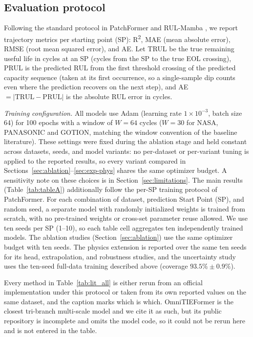 \documentclass[final,5p,times,twocolumn]{elsarticle}
\begin{document}
\subsection{Evaluation protocol}
\label{sec:protocol}

Following the standard protocol in PatchFormer \cite{ref_patchformer}
and RUL-Mamba \cite{ref_rulmamba}, we report trajectory
metrics per starting point (SP): R\textsuperscript{2}, MAE (mean absolute error),
RMSE (root mean squared error), and AE. Let TRUL be the true
remaining useful life in cycles at an SP (cycles from the SP to the
true EOL crossing), PRUL is the predicted RUL from the first threshold
crossing of the predicted capacity sequence (taken at its first occurrence, so
a single-sample dip counts even where the prediction recovers on the next
step), and AE $= |\text{TRUL} - \text{PRUL}|$ is the absolute RUL error in
cycles.

\emph{Training configuration.} All models use Adam (learning rate
$1\times10^{-3}$, batch size 64) for 100 epochs with a window of
$W{=}64$ cycles ($W{=}30$ for NASA, PANASONIC and GOTION, matching the
window convention of the baseline literature). These settings were
fixed during the ablation stage and held constant across datasets,
seeds, and model variants: no per-dataset or per-variant tuning is
applied to the reported results, so every variant compared in
Sections~\ref{sec:ablation}--\ref{sec:exp-phys} shares the same optimizer
budget. A sensitivity note on these choices is in
Section~\ref{sec:limitations}.
The main results (Table~\ref{tab:tableA}) additionally follow the
per-SP training protocol of PatchFormer. For each combination of dataset, prediction Start Point (SP), 
and random seed, a separate model with randomly initialized weights is trained from scratch, 
with no pre-trained weights or cross-set parameter reuse allowed. We use ten seeds per
SP (1--10), so each table cell aggregates ten independently trained
models. The ablation studies (Section~\ref{sec:ablation}) use the
same optimizer budget with ten seeds. The physics extension is
reported over the same ten seeds for its head, extrapolation, and
robustness studies, and the uncertainty study uses the ten-seed
full-data training described above (coverage
$93.5\%\pm0.9\%$).

Every method in Table~\ref{tab:lit_all} is either rerun from an official
implementation under this protocol or taken from its own reported values on
the same dataset, and the caption marks which is which. OmniTIEFormer
\cite{ref_omnitie} is the closest tri-branch multi-scale model and we cite it
as such, but its public repository is incomplete and omits the model code, so
it could not be rerun here and is not entered in the table.
\end{document}

